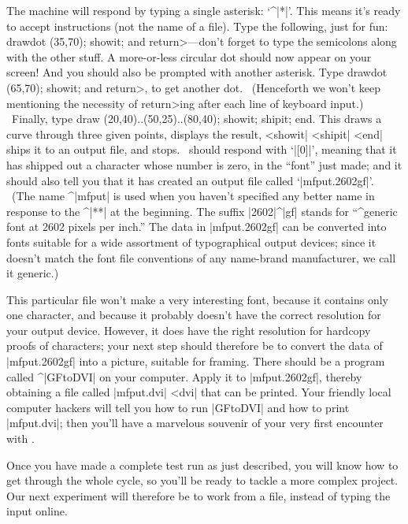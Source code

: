 The machine will respond by typing a single asterisk: `^|*|'. This means
it's ready to accept instructions (not the name of a file). Type the
following, just for fun:
\begintt
drawdot (35,70); showit;
\endtt
and \<return>---don't forget to type the semicolons along with the other
stuff. A more-or-less circular dot should now appear on your screen! And
you should also be prompted with another asterisk.
Type
\begintt
drawdot (65,70); showit;
\endtt
and \<return>, to get another dot. \ (Henceforth we won't keep mentioning
the necessity of \<return>ing after each line of keyboard input.) \ Finally,
type
\begintt
draw (20,40)..(50,25)..(80,40); showit; shipit; end.
\endtt
This draws a curve through three given points, displays the result,
^^|showit| ^^|shipit| ^^|end|
ships it to an output file, and stops. \MF\ should respond with `|[0]|',
meaning that it has shipped out a character whose number is zero, in the
``font'' just made; and it should also tell you that it has created
an output file called `|mfput.2602gf|'. \ (The name ^|mfput| is used when
you haven't specified any better name in response to the ^|**| at the
beginning. The suffix |2602|^|gf| stands for ``^{generic font} at
2602 pixels per inch.'' The data in |mfput.2602gf| can be converted into
fonts suitable for a wide assortment of typographical output devices;
since it doesn't match the font file conventions of any name-brand
manufacturer, we call it generic.)

This particular file won't make a very interesting font,
because it contains only one character, and because it probably doesn't
have the correct resolution for your output device. However, it does
have the right resolution for hardcopy proofs of characters; your next
step should therefore be to convert the data of |mfput.2602gf| into a
picture, suitable for framing. There should be a program called
^|GFtoDVI| on your computer. Apply it to |mfput.2602gf|, thereby
obtaining a file called |mfput.dvi| ^^|dvi| that can be printed.
Your friendly local computer hackers will tell you how to run
|GFtoDVI| and how to print |mfput.dvi|; then you'll have a marvelous
souvenir of your very first encounter with \MF\!. 

\smallskip
Once you have made a complete test run as just described, you will
know how to get through the whole cycle, so you'll be ready to tackle
a more complex project. Our next experiment will therefore be
to work from a file, instead of typing the input online.


